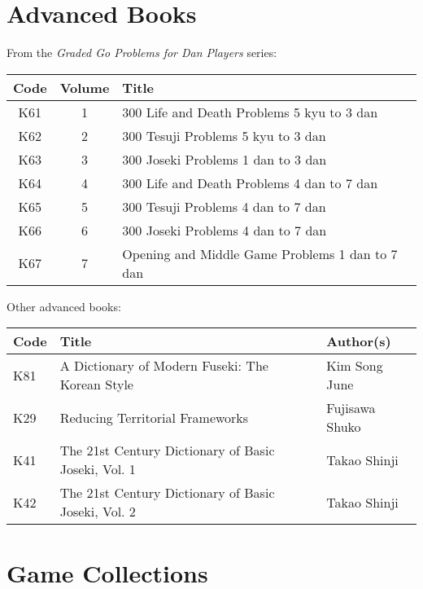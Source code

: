 \section{Advanced Books}

From the \emph{Graded Go Problems for Dan Players} series:

\begin{longtable}{c|c|l} 
    \hline
    \textbf{Code} & \textbf{Volume} & \textbf{Title} \\
    \hline \hline
    K61 & 1 & 300 Life and Death Problems 5 kyu to 3 dan \\
    \hline
    K62 & 2 & 300 Tesuji Problems 5 kyu to 3 dan \\
    \hline
    K63 & 3 & 300 Joseki Problems 1 dan to 3 dan \\
    \hline
    K64 & 4 & 300 Life and Death Problems 4 dan to 7 dan \\
    \hline
    K65 & 5 & 300 Tesuji Problems 4 dan to 7 dan \\
    \hline
    K66 & 6 & 300 Joseki Problems 4 dan to 7 dan \\
    \hline
    K67 & 7 & Opening and Middle Game Problems 1 dan to 7 dan \\
    \hline
\end{longtable}

Other advanced books:

\begin{longtable}{l|p{55mm}|p{55mm}} 
    \hline
    \textbf{Code} & \textbf{Title} & \textbf{Author(s)} \\
    \hline \hline
    K81 & A Dictionary of Modern Fuseki: The Korean Style & Kim Song June \\
    \hline
    K29 & Reducing Territorial Frameworks & Fujisawa Shuko \\
    \hline
    K41 & The 21st Century Dictionary of Basic Joseki, Vol. 1 & Takao Shinji \\
    \hline
    K42 & The 21st Century Dictionary of Basic Joseki, Vol. 2 & Takao Shinji \\
    \hline
\end{longtable}

\section{Game Collections}

